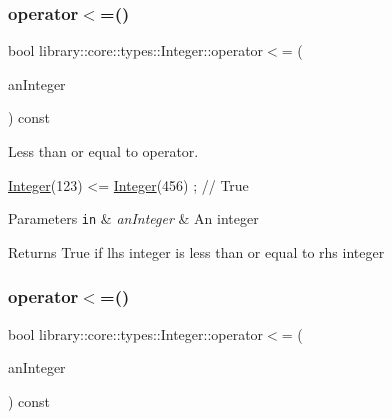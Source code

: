 \mbox{\label{classlibrary_1_1core_1_1types_1_1Integer_a57c084e8ca66e33675a706868b555962}} 
\subsubsection{\texorpdfstring{operator$<$=()}{operator<=()}\hspace{0.1cm}{\footnotesize\ttfamily [1/2]}}
{\footnotesize\ttfamily bool library\+::core\+::types\+::\+Integer\+::operator$<$= (\begin{DoxyParamCaption}\item[{const \hyperlink{classlibrary_1_1core_1_1types_1_1Integer}{Integer} \&}]{an\+Integer }\end{DoxyParamCaption}) const}



Less than or equal to operator. 


\begin{DoxyCode}
\hyperlink{classlibrary_1_1core_1_1types_1_1Integer_a6483b1c4e13e5ed6af5e7a58347efead}{Integer}(123) <= \hyperlink{classlibrary_1_1core_1_1types_1_1Integer_a6483b1c4e13e5ed6af5e7a58347efead}{Integer}(456) ; \textcolor{comment}{// True}
\end{DoxyCode}



\begin{DoxyParams}[1]{Parameters}
\mbox{\tt in}  & {\em an\+Integer} & An integer \\
\hline
\end{DoxyParams}
\begin{DoxyReturn}{Returns}
True if lhs integer is less than or equal to rhs integer 
\end{DoxyReturn}
\mbox{\label{classlibrary_1_1core_1_1types_1_1Integer_a09f6844cd7557f087116a50869765eaa}} 
\subsubsection{\texorpdfstring{operator$<$=()}{operator<=()}\hspace{0.1cm}{\footnotesize\ttfamily [2/2]}}
{\footnotesize\ttfamily bool library\+::core\+::types\+::\+Integer\+::operator$<$= (\begin{DoxyParamCaption}\item[{const \hyperlink{classlibrary_1_1core_1_1types_1_1Integer_a623afb1580f870fd8a1997b1c12c917d}{Integer\+::\+Value\+Type} \&}]{an\+Integer }\end{DoxyParamCaption}) const}

